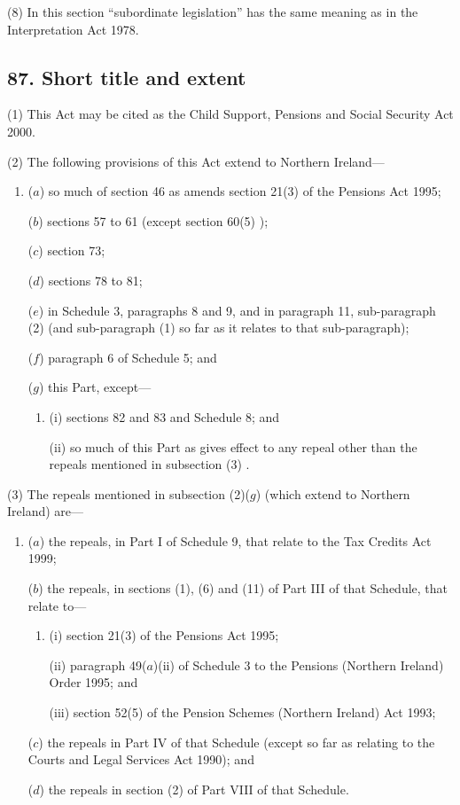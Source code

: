 \documentclass[12pt,a4paper]{article}
\begin{document}
(8) In this section “subordinate legislation” has the same meaning as in the  Interpretation Act 1978. 

\subsection{87. Short title and extent}

(1) This Act may be cited as the Child Support, Pensions and Social Security Act 2000. 

(2) The following provisions of this Act extend to Northern Ireland—
\begin{enumerate}\item[]
($a$) so much of section 46 as amends section 21(3)  of the Pensions Act 1995;

($b$) sections 57 to 61 (except section 60(5) );

($c$) section 73;

($d$) sections 78 to 81;

($e$) in Schedule 3, paragraphs 8 and 9, and in paragraph 11, sub-paragraph (2)  (and sub-paragraph (1)  so far as it relates to that sub-paragraph);

($f$) paragraph 6 of Schedule 5; and

($g$) this Part, except—
\begin{enumerate}\item[]
(i) sections 82 and 83 and Schedule 8; and

(ii) so much of this Part as gives effect to any repeal other than the repeals mentioned in subsection (3) .
\end{enumerate}
\end{enumerate}

(3) The repeals mentioned in subsection (2)($g$)  (which extend to Northern Ireland) are—
\begin{enumerate}\item[]
($a$) the repeals, in Part I of Schedule 9, that relate to the Tax Credits Act 1999;

($b$) the repeals, in sections (1), (6)  and (11)  of Part III of that Schedule, that relate to—
\begin{enumerate}\item[]
(i) section 21(3)  of the Pensions Act 1995;

(ii) paragraph 49($a$)(ii)  of Schedule 3 to the Pensions (Northern Ireland) Order 1995; and

(iii) section 52(5)  of the Pension Schemes (Northern Ireland) Act 1993;
\end{enumerate}

($c$) the repeals in Part IV of that Schedule (except so far as relating to the Courts and Legal Services Act 1990); and

($d$) the repeals in section (2)  of Part VIII of that Schedule.
\end{enumerate}
\end{document}

